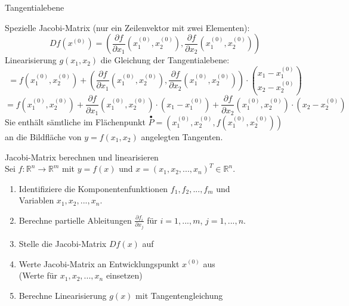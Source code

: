 \begin{corollary}{Tangentialebene}

    Spezielle Jacobi-Matrix (nur ein Zeilenvektor mit zwei Elementen):
    $$Df(x^{(0)}) = \left(\frac{\partial f}{\partial x_1}(x_1^{(0)}, x_2^{(0)}), \frac{\partial f}{\partial x_2}(x_1^{(0)}, x_2^{(0)})\right)$$
    Linearisierung $g(x_1, x_2)$ die Gleichung der Tangentialebene: 
    $$=f(x_1^{(0)}, x_2^{(0)}) + \left(\frac{\partial f}{\partial x_1}(x_1^{(0)}, x_2^{(0)}), \frac{\partial f}{\partial x_2}(x_1^{(0)}, x_2^{(0)})\right) \cdot \binom{x_1 - x_1^{(0)}}{x_2 - x_2^{(0)}}$$
    $$= f(x_1^{(0)}, x_2^{(0)}) + \frac{\partial f}{\partial x_1}(x_1^{(0)}, x_2^{(0)}) \cdot (x_1 - x_1^{(0)}) + \frac{\partial f}{\partial x_2}(x_1^{(0)}, x_2^{(0)}) \cdot (x_2 - x_2^{(0)})$$
    \small
    Sie enthält sämtliche im Flächenpunkt 
    $\stackrel{\bullet}{P}=\left(x_1^{(0)}, x_2^{(0)}, f(x_1^{(0)}, x_2^{(0)})\right)$ \\
    an die Bildfläche von $y=f(x_1, x_2)$ angelegten Tangenten.
\end{corollary}

\begin{KR}{Jacobi-Matrix berechnen und linearisieren}\\
Sei $f: \mathbb{R}^n \rightarrow \mathbb{R}^m$ mit $y = f(x)$ und $x = (x_1, x_2, ..., x_n)^T \in \mathbb{R}^n$. 
\vspace{-2mm}\\
\begin{enumerate}
    \item Identifiziere die Komponentenfunktionen $f_1, f_2, ..., f_m$ und \\ Variablen $x_1, x_2, ..., x_n$.
    \item Berechne partielle Ableitungen $\frac{\partial f_i}{\partial x_j}$ für $i = 1, ..., m$, $j = 1, ..., n$.
    \item Stelle die Jacobi-Matrix $Df(x)$ auf
    \item Werte Jacobi-Matrix an Entwicklungspunkt $x^{(0)}$ aus\\ (Werte für $x_1, x_2, ..., x_n$ einsetzen)
    \item Berechne Linearisierung $g(x)$ mit Tangentengleichung
\end{enumerate}
\end{KR}

